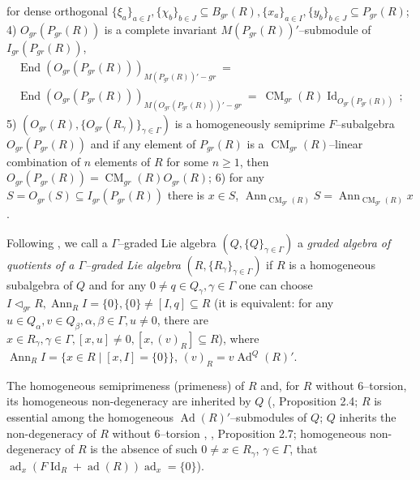 \documentclass[a4paper,11pt]{article}
\DeclareMathOperator{\ad}{ad}
\DeclareMathOperator{\Ad}{Ad}
\DeclareMathOperator{\Id}{Id}
\DeclareMathOperator{\End}{End}
\DeclareMathOperator{\CM}{CM}
\DeclareMathOperator{\Ann}{Ann}
\begin{document}
for dense orthogonal 
${\{\xi_a\}_{a\in I}, \{\chi_b\}_{b\in J}\subseteq B_{gr}(R), 
\{x_a\}_{a\in I}, \{y_b\}_{b\in J}\subseteq P_{gr}(R)}$;
4) $O_{gr}(P_{gr}(R))$ is a complete invariant $M(P_{gr}(R))'$--submodule of 
$I_{gr}(P_{gr}(R))$, 
\begin{multline*}
\End(O_{gr}(P_{gr}(R)))_{M(P_{gr}(R))'-gr}\ =
\\ 
\End(O_{gr}(P_{gr}(R)))_{M(O_{gr}(P_{gr}(R)))'-gr}\ =\ 
\CM_{gr}(R) \Id_{O_{gr}(P_{gr}(R))}\,;
\end{multline*} 
5) ${(O_{gr}(R), \{O_{gr}(R_{\gamma})\}_{\gamma\in \Gamma})}$ is a homogeneously 
semiprime $F$--subalgebra $O_{gr}(P_{gr}(R))$ and if any element of 
$P_{gr}(R)$ is a $\CM_{gr}(R)$--linear combination of $n$ elements of 
$R$ for some ${n\geq 1}$, then ${O_{gr}(P_{gr}(R))=\CM_{gr}(R) O_{gr}(R)}$; 
6) for any ${S=O_{gr}(S)\subseteq I_{gr}(P_{gr}(R))}$ there is ${x\in S}$, 
${\Ann_{\CM_{gr}(R)} S=\Ann_{\CM_{gr}(R)} x}$. 

Following \cite{OMol}, we call a $\Gamma$--graded Lie algebra 
${(Q, \{Q\}_{\gamma\in \Gamma})}$ a \emph{graded algebra of quotients of a 
$\Gamma$--graded Lie algebra} ${(R, \{R_{\gamma}\}_{\gamma\in \Gamma})}$ 
if $R$ is a homogeneous subalgebra of $Q$ and for any 
${0\ne q\in Q_{\gamma}, \gamma\in \Gamma}$ one can choose 
${I\lhd_{gr} R, \Ann_R I=\{0\}, \{0\}\ne [I, q]\subseteq R}$ 
(it is equivalent: for any ${u\in Q_{\alpha}, v\in Q_{\beta}, \alpha, \beta\in 
\Gamma, u\ne 0}$, there are ${x\in R_{\gamma}, \gamma\in \Gamma, 
[x, u]\ne 0, [x, (v)_R]\subseteq R}$), where 
${\Ann_R I=\{x\in R\mid [x, I]=\{0\}\}}$, ${(v)_R=v \Ad^Q(R)'}$.

The homogeneous semiprimeness (primeness) of $R$ and, for $R$ without 
$6$--torsion, its homo\-geneous non-degeneracy are inherited by $Q$ 
(\cite{OMol}, Proposition 2.4; $R$ is essential among the homogeneous 
$\Ad(R)'$--submodules of $Q$; $Q$ inherits the non-degeneracy of $R$ 
without $6$--torsion \cite{Mol}, \cite{OMol}, Proposition 2.7; 
homogeneous non-degeneracy of $R$ is the absence of such 
${0\ne x\in R_{\gamma}}$, ${\gamma\in \Gamma}$, that 
${\ad_x (F \Id_R+\ad(R)) \ad_x=\{0\}}$). 
\end{document}
